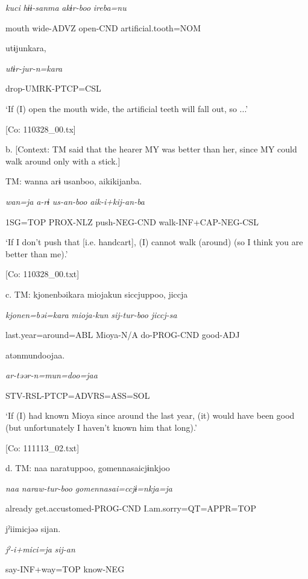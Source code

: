       \textit{kuci}  \textit{hɨɨ-sanma}  \textit{akɨr-boo}  \textit{ireba=nu}

      mouth  wide-ADVZ  open-CND  artificial.tooth=NOM

      utɨjunkara,

      \textit{utɨr-jur-n=kara}

      drop-UMRK-PTCP=CSL

      ‘If (I) open the mouth wide, the artificial teeth will fall out, so ...’

      [Co: 110328\_00.tx]

  b.  [Context: TM said that the hearer MY was better than her, since MY could walk around only with a stick.]

    TM:  wanna  arɨ  usanboo,  aikikijanba.

      \textit{wan=ja}  \textit{a-rɨ}  \textit{us-an-boo}  \textit{aik-i+kij-an-ba}

      1SG=TOP  PROX-NLZ  push-NEG-CND  walk-INF+CAP-NEG-CSL

      ‘If I don’t push that [i.e. handcart], (I) cannot walk (around) (so I think you are better than me).’

      [Co: 110328\_00.txt]

  c.  TM:  {\textbar}kjonen{\textbar}bəikara  mioja{\textbar}kun{\textbar}  siccjuppoo,  jiccja

      \textit{kjonen=bəi=kara}  \textit{mioja-kun}  \textit{sij-tur-boo}  \textit{jiccj-sa}

      last.year=around=ABL  Mioya-N/A  do-PROG-CND  good-ADJ

      atənmundoojaa.

      \textit{ar-təər-n=mun=doo=jaa}

      STV-RSL-PTCP=ADVRS=ASS=SOL

      ‘If (I) had known Mioya since around the last year, (it) would have been good (but unfortunately I haven’t known him that long).’

      [Co: 111113\_02.txt]

  d.  TM:  naa  naratuppoo,  {\textbar}gomennasai{\textbar}cjɨnkjoo

      \textit{naa}  \textit{naraw-tur-boo}  \textit{gomennasai=ccjɨ=nkja=ja}

      already  get.accustomed-PROG-CND  I.am.sorry=QT=APPR=TOP

      jˀiimicjəə  sijan.

      \textit{jˀ-i+mici=ja}  \textit{sij-an}

      say-INF+way=TOP  know-NEG

